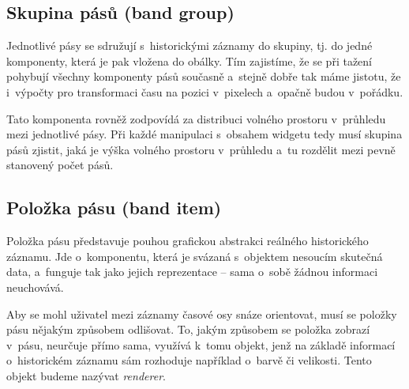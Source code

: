 		\subsection{Skupina pásů (band group)}
		\label{skupina-pasu}
			\vbox{Jednotlivé pásy se sdružují s~historickými záznamy do skupiny, tj. do jedné komponenty, která je pak vložena do obálky. Tím zajistíme, že se při tažení pohybují všechny komponenty pásů současně a~stejně dobře tak máme jistotu, že i~výpočty pro transformaci času na pozici v~pixelech a~opačně budou v~pořádku.} 
			
			Tato komponenta rovněž zodpovídá za distribuci volného prostoru v~průhledu mezi jednotlivé pásy. Při každé manipulaci s~obsahem widgetu tedy musí skupina pásů zjistit, jaká je výška volného prostoru v~průhledu a~tu rozdělit mezi pevně stanovený počet pásů.
		
		\subsection{Položka pásu (band item)}
			\label{banditem}
			Položka pásu představuje pouhou grafickou abstrakci reálného historického zá\-znamu. Jde o~komponentu, která je svázaná s~objektem nesoucím skutečná data, a~funguje tak jako jejich reprezentace -- sama o~sobě žádnou informaci neuchovává.
			
			Aby se mohl uživatel mezi záznamy časové osy snáze orientovat, musí se položky pásu nějakým způsobem odlišovat. To, jakým způsobem se položka zobrazí v~pásu, neurčuje přímo sama, využívá k~tomu objekt, jenž na základě informací o~historickém záznamu sám rozhoduje například o~barvě či velikosti. Tento objekt budeme nazývat \emph{renderer}. 

